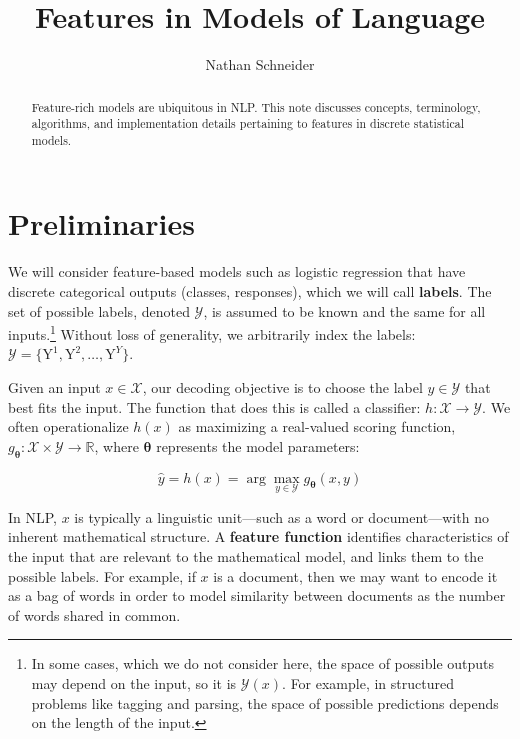 \documentclass[11pt,letterpaper]{article}
\title{\draftnotice{{\it\small WORKING DRAFT}\\[5pt] }Features in Models of Language}
\author{Nathan Schneider}
\date{}
\newcommand{\params}{\mathbf{\theta}}
\begin{document}
\maketitle
\begin{abstract}
\noindent Feature-rich models are ubiquitous in NLP. 
This note discusses concepts, terminology, algorithms, and implementation details pertaining to features in discrete statistical models.
\end{abstract}

\section{Preliminaries}

We will consider feature-based models such as logistic regression 
that have discrete categorical outputs (classes, responses), which we will call {\bf labels}. 
The set of possible labels, denoted $\mathcal{Y}$, is assumed to be known and the same for all inputs.\footnote{In some cases, which we do not consider here, the space of possible outputs may depend on the input, so it is $\mathcal{Y}(x)$. 
For example, in structured problems like tagging and parsing, the space of possible predictions depends on the length of the input.}
Without loss of generality, we arbitrarily index the labels: $\mathcal{Y}=\{\mathrm{Y}^1,\mathrm{Y}^2,\ldots,\mathrm{Y}^{Y}\}$.

Given an input $x \in \mathcal{X}$, our decoding objective is 
to choose the label $y \in \mathcal{Y}$ that best fits the input. 
The function that does this is called a classifier: $h: \mathcal{X}\rightarrow\mathcal{Y}$.
We often operationalize $h(x)$ as maximizing a real-valued scoring function, $g_\params: \mathcal{X}\times\mathcal{Y}\rightarrow\mathbb{R}$, 
where $\params$ represents the model parameters: 

\begin{equation}\label{eq:classifier}
\hat{y} = h(x) = \arg\max_{y\in\mathcal{Y}} g_\params(x,y)
\end{equation}

In NLP, $x$ is typically a linguistic unit---such as a word or document---with no inherent mathematical structure. 
A {\bf feature function} identifies characteristics of the input that are relevant to the mathematical model, 
and links them to the possible labels. 
For example, if $x$ is a document, then we may want to encode it as a bag of words 
in order to model similarity between documents as the number of words shared in common.
\end{document}
